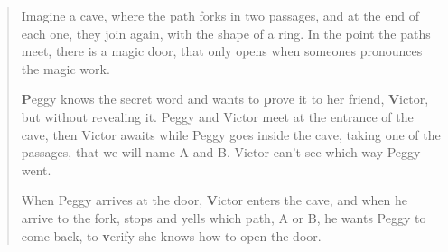 \hfil

\begin{quote}
	Imagine a cave, where the path forks in two passages, and at the end of each one, they join again, with the shape of a ring. In the point the paths meet, there is a magic door, that only opens when someones pronounces the magic work.
	
	\textbf{P}eggy knows the secret word and wants to \textbf{p}rove it to her friend, \textbf{V}ictor, but without revealing it.
	Peggy and Victor meet at the entrance of the cave, then Victor awaits while Peggy goes inside the cave, taking one of the passages, that we will name A and B. Victor can't see which way Peggy went. 
	
	When Peggy arrives at the door, \textbf{V}ictor enters the cave, and when he arrive to the fork, stops and yells which path, A or B, he wants Peggy to come back, to \textbf{v}erify she knows how to open the door.
	

\end{quote}
